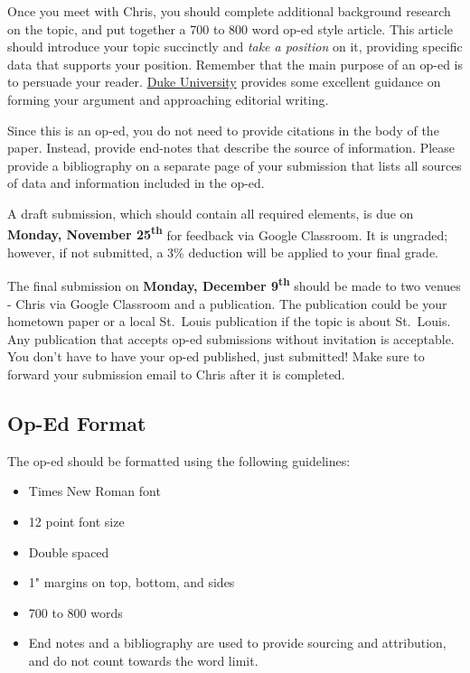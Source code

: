 \documentclass[]{book}
\providecommand{\tightlist}{%
  \setlength{\itemsep}{0pt}\setlength{\parskip}{0pt}}
\begin{document}
Once you meet with Chris, you should complete additional background research on the topic, and put together a 700 to 800 word op-ed style article. This article should introduce your topic succinctly and \emph{take a position} on it, providing specific data that supports your position. Remember that the main purpose of an op-ed is to persuade your reader. \href{https://styleguide.duke.edu/toolkits/writing-media/how-to-write-an-op-ed-article/}{Duke University} provides some excellent guidance on forming your argument and approaching editorial writing.

Since this is an op-ed, you do not need to provide citations in the body of the paper. Instead, provide end-notes that describe the source of information. Please provide a bibliography on a separate page of your submission that lists all sources of data and information included in the op-ed.

A draft submission, which should contain all required elements, is due on \textbf{Monday, November 25\textsuperscript{th}} for feedback via Google Classroom. It is ungraded; however, if not submitted, a 3\% deduction will be applied to your final grade.

The final submission on \textbf{Monday, December 9\textsuperscript{th}} should be made to two venues - Chris via Google Classroom and a publication. The publication could be your hometown paper or a local St.~Louis publication if the topic is about St.~Louis. Any publication that accepts op-ed submissions without invitation is acceptable. You don't have to have your op-ed published, just submitted! Make sure to forward your submission email to Chris after it is completed.

\hypertarget{op-ed-format}{%
\subsection{Op-Ed Format}\label{op-ed-format}}

The op-ed should be formatted using the following guidelines:

\begin{itemize}
\tightlist
\item
  Times New Roman font
\item
  12 point font size
\item
  Double spaced
\item
  1" margins on top, bottom, and sides
\item
  700 to 800 words
\item
  End notes and a bibliography are used to provide sourcing and attribution, and do not count towards the word limit.
\end{itemize}
\end{document}
